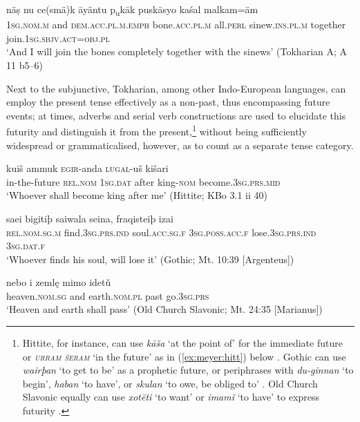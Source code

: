 \documentclass[output=paper,colorlinks,citecolor=brown]{langscibook}
\begin{document}
	\ea \label{ex:meyer:tokh}
	\gll näṣ nu ce(smä)k āyäntu p\textsubscript{u}kāk puskāsyo kaśal malkam=äm\\
	\textsc{1sg.nom.m} and \textsc{dem.acc.pl.m.emph} bone.\textsc{acc.pl.m} all.\textsc{perl} sinew.\textsc{ins.pl.m} together join.\textsc{1sg.sbjv.act=obj.pl}\\
	\glt ‘And I will join the bones completely together with the sinews’ (Tokharian A; A 11 b5–6)
	\z

	\largerpage[-1.5]
	
	Next to the subjunctive, Tokharian, among other Indo-European languages, can employ the present tense  effectively as a non-past, thus encompassing future events; at times, adverbs and serial verb constructions are used to elucidate this futurity and distinguish it from the present,\footnote{Hittite, for instance, can use \textit{kāša} ‘at the point of’ for the immediate future or \textsc{\textit{urram šeram}} ‘in the future’ as in (\ref{ex:meyer:hitt}) below \citep[324]{HoffnerMelchert2008}. Gothic can use \textit{wairþan} ‘to get to be’ as a prophetic future, or periphrases with \textit{du-ginnan} ‘to begin’, \textit{haban} ‘to have’, or \textit{skulan} ‘to owe, be obliged to’ \citep{Kleyner2015}. Old Church Slavonic equally can use \textit{xotĕti} ‘to want’ or \textit{imamǐ} ‘to have’ to express futurity \citep{Lunt2001}.} without being sufficiently widespread or grammaticalised, however, as to count as a separate tense category.
	
	\ea \label{ex:meyer:hitt}
	 kuiš ammuk \textsc{egir}-anda \textsc{lugal}-uš kišari\\
	in-the-future \textsc{rel.nom} \textsc{1sg.dat} after king-\textsc{nom} become.\textsc{3sg.prs.mid}\\
	\glt ‘Whoever shall become king after me’ (Hittite; KBo 3.1 ii 40)
	\z
	
	\ea \label{ex:meyer:goth}
	\gll  saei bigitiþ saiwala seina, fraqisteiþ izai\\
	\textsc{rel.nom.sg.m} find.\textsc{3sg.prs.ind} soul.\textsc{acc.sg.f} \textsc{3sg.poss.acc.f} lose.\textsc{3sg.prs.ind} \textsc{3sg.dat.f}\\
	\glt ‘Whoever finds his soul, will lose it’ (Gothic; Mt. 10:39 [Argenteus])
	\z

	\ea \label{ex:meyer:ocs}
	\gll nebo i zemlę mimo idetǔ\\
	heaven.\textsc{nom.sg} and earth.\textsc{nom.pl} past go.\textsc{3sg.prs}\\
	\glt ‘Heaven and earth shall pass’ (Old Church Slavonic; Mt. 24:35 [Marianus])
	\z
	
\end{document}

